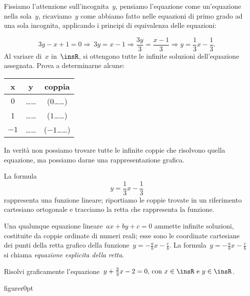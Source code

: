 Fissiamo l'attenzione sull'incognita~$y$,
pensiamo l'equazione come un'equazione
nella sola~$y$, ricaviamo~$y$ come abbiamo fatto nelle equazioni di primo
grado ad una sola incognita, applicando i principi di equivalenza delle
equazioni:

\begin{equation*}
3y-x+1=0\Rightarrow~3y=x-1\Rightarrow\frac{3y}{3}=\frac{x-1}{3}\Rightarrow 
y=\frac{1}{3}x-\frac{1}{3}.
\end{equation*}
Al variare di~$x$ in~$\insR$, si ottengono tutte le infinite
soluzioni dell'equazione assegnata.
Prova a determinarne alcune:
\begin{center}
 \begin{tabular}{ccc}
\toprule
x & y & coppia\\
\midrule
$0$ &\ldots\ldots & ($0$\ldots\ldots)\\
1& \ldots\ldots &($1$\ldots\ldots)\\
$-1$ & \ldots\ldots & ($-1$\ldots\ldots)\\
\bottomrule
\end{tabular}
\end{center}

In verità non possiamo trovare tutte le infinite coppie che risolvono
quella equazione, ma possiamo darne una rappresentazione grafica.

\begin{wrapfigure}{o}{0pt}
 
\end{wrapfigure}

La formula \[y=\frac{1}{3}x-\frac{1}{3}\] rappresenta una funzione
lineare; riportiamo le coppie trovate in un riferimento cartesiano
ortogonale e tracciamo la retta che rappresenta la funzione.

Una qualunque equazione lineare~$ax+by+c=0$ ammette infinite
soluzioni, costituite da coppie ordinate di numeri reali; esse sono le
coordinate cartesiane dei punti della retta grafico della 
funzione~$y=-{\frac{a}{b}}x-\frac{c}{b}$.
La formula~$y=-{\frac{a}{b}}x-\frac{c}{b}$ si chiama \emph{equazione esplicita 
della retta}.

\begin{esempio}
 Risolvi graficamente l'equazione~$y+\frac{2}{3}x-2=0\text{, con 
}x\in\insR\text{ e }y\in\insR$.
\end{esempio}

\begin{wrapfloat}{figure}{r}{0pt}

\end{wrapfloat}

